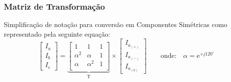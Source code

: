 \documentclass{article}
\begin{document}
    \subsubsection{Matriz de Transformação}
        \begin{definition}
            Simplificação de notação para conversão em Componentes Simétricas como representado pela seguinte equação:
                \begin{equation}
                    \boxed{
                        \begin{bmatrix}
                            I_{a}\\
                            I_{b}\\
                            I_{c}
                        \end{bmatrix}
                        = 
                        \underbrace{
                            \begin{bmatrix}
                                1 & 1 & 1\\
                                \alpha^{2} & \alpha     & 1\\
                                \alpha     & \alpha^{2} & 1\\
                            \end{bmatrix}
                        }_{\text{T}}
                        \times 
                        \begin{bmatrix}
                            I_{a_{(+)}}\\
                            I_{a_{(-)}}\\
                            I_{a_{(0)}}
                        \end{bmatrix}
                    }
                    \qquad
                    \text{onde:}
                    \quad
                    \alpha = \text{e}^{+j120^{\circ}}
                \end{equation}
        \end{definition}
\end{document}
